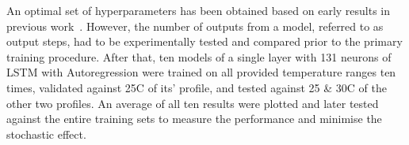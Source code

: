  {
An optimal set of hyperparameters has been obtained based on early results in previous work~\cite{sadykov_practical_2022}.
}
However, the number of outputs from a model, referred to as output steps, had to be experimentally tested and compared prior to the primary training procedure.
After that, ten models of a single layer with 131 neurons of LSTM with Autoregression were trained on all provided temperature ranges ten times, validated against 25\textdegree{}C of its' profile, and tested against 25 \& 30\textdegree{}C of the other two profiles.
An average of all ten results were plotted and later tested against the entire training sets to measure the performance and minimise the stochastic effect.

